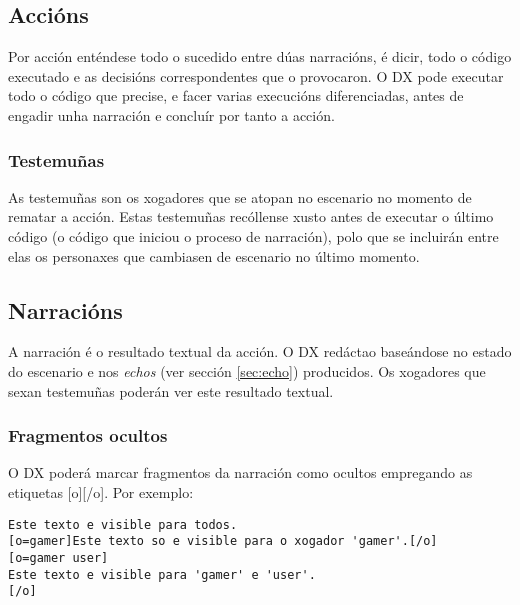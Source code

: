 \subsection{Accións}
Por acción enténdese todo o sucedido entre dúas narracións, é dicir, todo o
código executado e as decisións correspondentes que o provocaron. O DX pode
executar todo o código que precise, e facer varias execucións diferenciadas,
antes de engadir unha narración e concluír por tanto a acción.
\subsubsection{Testemuñas}
As testemuñas son os xogadores que se atopan no escenario no momento de rematar
a acción. Estas testemuñas recóllense xusto antes de executar o último código (o
código que iniciou o proceso de narración), polo que se incluirán entre elas os
personaxes que cambiasen de escenario no último momento.

\subsection{Narracións}
A narración é o resultado textual da acción. O DX redáctao baseándose no estado
do escenario e nos {\it echos} (ver sección \ref{sec:echo}) producidos. Os
xogadores que sexan testemuñas poderán ver este resultado textual.
\subsubsection{Fragmentos ocultos}
O DX poderá marcar fragmentos da narración como ocultos empregando as etiquetas
[o][/o]. Por exemplo:
\begin{lstlisting}
Este texto e visible para todos.
[o=gamer]Este texto so e visible para o xogador 'gamer'.[/o]
[o=gamer user]
Este texto e visible para 'gamer' e 'user'.
[/o]
\end{lstlisting}





